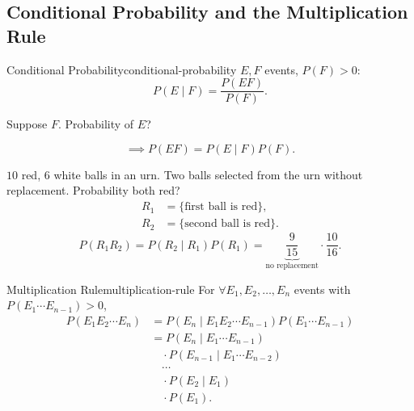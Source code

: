 \subsection{Conditional Probability and the Multiplication Rule}

\begin{definition}{Conditional Probability}{conditional-probability}
  $E,F$ events, $P(F)>0$:
  \[
    P(E\mid F)=\frac{P(EF)}{P(F)}.
  \]
\end{definition}

\begin{thinking}
  Suppose $F$. Probability of $E$?
  \begin{center}
  \end{center}
\end{thinking}

\[
  \implies P(EF)=P(E\mid F)P(F).
\]

\begin{example}
  $10$ red, $6$ white balls in an urn. Two balls selected from the urn without replacement.
  Probability both red?
  \begin{align*}
    R_1 & =\{\text{first ball is red}\},  \\
    R_2 & =\{\text{second ball is red}\}.
  \end{align*}
  \[
    P(R_1R_2)=P(R_2\mid R_1)P(R_1)
    =\underbrace{\frac9{15}}_{\text{no replacement}}\cdot\frac{10}{16}.
  \]
\end{example}

\begin{theorem}{Multiplication Rule}{multiplication-rule}
  For $\forall E_1,E_2,\ldots,E_n$ events with $P(E_1\cdots E_{n-1})>0$,
  \begin{align*}
    P(E_1E_2\cdots E_n)
     & =P(E_n\mid E_1E_2\cdots E_{n-1})P(E_1\cdots E_{n-1}) \\
     & =P(E_n\mid E_1\cdots E_{n-1})                        \\
     & \quad\cdot P(E_{n-1}\mid E_1\cdots E_{n-2})          \\
     & \quad\cdots                                          \\
     & \quad\cdot P(E_2\mid E_1)                            \\
     & \quad\cdot P(E_1).
  \end{align*}
\end{theorem}

